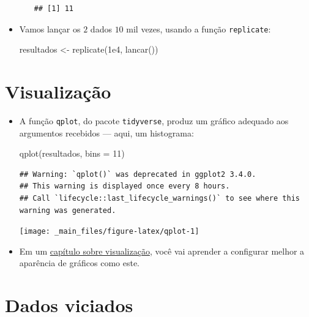 \documentclass[
  11pt]{report}
\newenvironment{Shaded}{\begin{snugshade}}{\end{snugshade}}
\newcommand{\AttributeTok}[1]{\textcolor[rgb]{0.77,0.63,0.00}{#1}}
\newcommand{\DecValTok}[1]{\textcolor[rgb]{0.00,0.00,0.81}{#1}}
\newcommand{\FloatTok}[1]{\textcolor[rgb]{0.00,0.00,0.81}{#1}}
\newcommand{\FunctionTok}[1]{\textcolor[rgb]{0.00,0.00,0.00}{#1}}
\newcommand{\NormalTok}[1]{#1}
\newcommand{\OtherTok}[1]{\textcolor[rgb]{0.56,0.35,0.01}{#1}}
\renewenvironment{Shaded}{
    \begin{mdframed}[%
      roundcorner=2pt,%
      innerleftmargin=5pt,%
      innerrightmargin=5pt,%
      topline=true,%
      leftline=true,%
      rightline=true,%
      bottomline=true,%
      linewidth=0.5pt,%
      linecolor=black!20,%
      backgroundcolor=black!2,%
      skipabove=2ex,%
      skipbelow=2.5ex%
    ]%
  }
  {
    \end{mdframed}
  }
\begin{document}
\begin{itemize}
\begin{itemize}
\begin{verbatim}
## [1] 11
\end{verbatim}
  \end{itemize}
\item
  Vamos lançar os $2$ dados $10$ mil vezes, usando a função \texttt{replicate}:

\begin{Shaded}
\begin{Highlighting}[]
\NormalTok{resultados }\OtherTok{\textless{}{-}} \FunctionTok{replicate}\NormalTok{(}\FloatTok{1e4}\NormalTok{, }\FunctionTok{lancar}\NormalTok{())}
\end{Highlighting}
\end{Shaded}
\end{itemize}

\hypertarget{visualizauxe7uxe3o}{%
\section{Visualização}\label{visualizauxe7uxe3o}}

\begin{itemize}
\item
  A função \texttt{qplot}, do pacote \texttt{tidyverse}, produz um gráfico adequado aos argumentos recebidos --- aqui, um histograma:

\begin{Shaded}
\begin{Highlighting}[]
\FunctionTok{qplot}\NormalTok{(resultados, }\AttributeTok{bins =} \DecValTok{11}\NormalTok{)}
\end{Highlighting}
\end{Shaded}

\begin{verbatim}
## Warning: `qplot()` was deprecated in ggplot2 3.4.0.
## This warning is displayed once every 8 hours.
## Call `lifecycle::last_lifecycle_warnings()` to see where this warning was generated.
\end{verbatim}

  \begin{center}\texttt{[image: \_main\_files/figure-latex/qplot-1]} \end{center}
\item
  Em um \protect\hyperlink{viz}{capítulo sobre visualização}, você vai aprender a configurar melhor a aparência de gráficos como este.
\end{itemize}

\hypertarget{dados-viciados}{%
\section{Dados viciados}\label{dados-viciados}}
\end{document}
